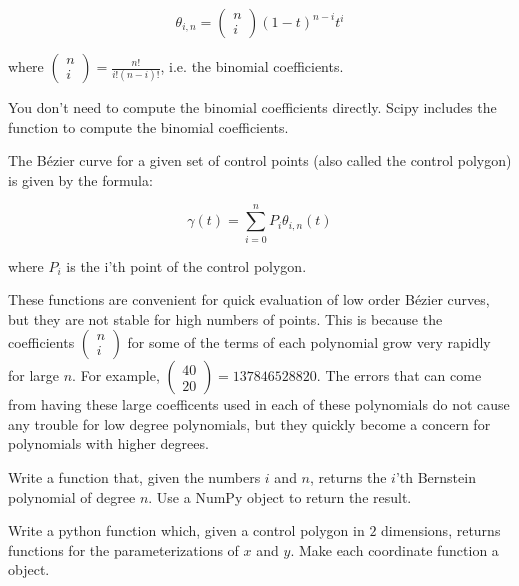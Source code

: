 $$\theta_{i,n}=\left( \begin{smallmatrix} n\\ i \end{smallmatrix} \right) (1-t)^{n-i} t^i$$

where $\left( \begin{smallmatrix} n\\ i \end{smallmatrix} \right) = \frac{n!}{i!(n-i)!}$, i.e. the binomial coefficients.

\begin{info}
You don't need to compute the binomial coefficients directly.
Scipy includes the function  to compute the binomial coefficients.
\end{info}

The B\'{e}zier curve for a given set of control points (also called the control polygon) is given by the formula:

$$\gamma (t) = \sum_{i=0}^n P_i \theta_{i,n} (t)$$

where $P_i$ is the i'th point of the control polygon.

These functions are convenient for quick evaluation of low order B\'{e}zier curves, but they are not stable for high numbers of points.
This is because the coefficients $\left( \begin{smallmatrix} n\\ i \end{smallmatrix} \right)$ for some of the terms of each polynomial grow very rapidly for large $n$.
For example, $\left( \begin{smallmatrix} 40\\ 20 \end{smallmatrix} \right)=137846528820$.
The errors that can come from having these large coefficents used in each of these polynomials do not cause any trouble for low degree polynomials, but they quickly become a concern for polynomials with higher degrees.

\begin{problem}
Write a function that, given the numbers $i$ and $n$, returns the $i$'th Bernstein polynomial of degree $n$.
Use a NumPy  object to return the result.
\end{problem}

\begin{problem}
Write a python function which, given a control polygon in $2$ dimensions, returns functions for the parameterizations of $x$ and $y$.
Make each coordinate function a  object.
\end{problem}

